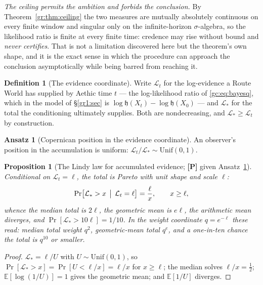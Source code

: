 \documentclass[11pt]{article}
\numberwithin{equation}{section}
\theoremstyle{plain}
\newtheorem{proposition}[theorem]{Proposition}
\theoremstyle{definition}
\newtheorem{definition}[theorem]{Definition}
\newtheorem{ansatz}[theorem]{Ansatz}
\theoremstyle{remark}
\newcommand{\E}{\mathbb{E}}
\newcommand{\Lc}{\mathcal{L}}
\newcommand{\hm}{\mathfrak{h}}
\begin{document}
\emph{The ceiling permits the ambition and forbids the conclusion.} By
Theorem~\ref{gr:thm:ceiling} the two measures are mutually absolutely
continuous on every finite window and singular only on the
infinite-horizon $\sigma$-algebra, so the likelihood ratio is finite at
every finite time: credence may rise without bound and \emph{never
certifies}. That is not a limitation discovered here but the theorem's
own shape, and it is the exact sense in which the procedure can approach
the conclusion asymptotically while being barred from reaching it.

\begin{definition}[The evidence coordinate]\label{gc:def:evidence}
Write $\Lc_t$ for the log-evidence a Route World has supplied by Aethic
time $t$ --- the log-likelihood ratio of \eqref{gc:eq:bayesq}, which in
the model of \S\ref{gr1:sec} is $\log\hm(X_t)-\log\hm(X_0)$ --- and
$\Lc_\ast$ for the total the conditioning ultimately supplies. Both are
nondecreasing, and $\Lc_\ast\ge\Lc_t$ by construction.
\end{definition}

\begin{ansatz}[Copernican position in the evidence coordinate]
\label{gc:ans:copernican}
An observer's position in the accumulation is uniform:
$\Lc_t/\Lc_\ast\sim\mathrm{Unif}(0,1)$.
\end{ansatz}

\begin{proposition}[The Lindy law for accumulated evidence;
\textbf{[P]} given Ansatz~\ref{gc:ans:copernican}]\label{gc:prop:lindy}
Conditional on $\Lc_t=\ell$, the total is Pareto with unit shape and
scale $\ell$:
\begin{equation}\label{gc:eq:lindylaw}
\Pr\bigl[\Lc_\ast>x\,\bigm|\,\Lc_t=\ell\bigr]=\frac{\ell}{x},
\qquad x\ge\ell,
\end{equation}
whence the median total is $2\ell$, the geometric mean is $e\ell$, the
arithmetic mean diverges, and $\Pr[\Lc_\ast>10\ell]=1/10$. In the
weight coordinate $q=e^{-\ell}$ these read: median total weight $q^{2}$,
geometric-mean total $q^{e}$, and a one-in-ten chance the total is
$q^{10}$ or smaller.
\end{proposition}

\begin{proof}
$\Lc_\ast=\ell/U$ with $U\sim\mathrm{Unif}(0,1)$, so
$\Pr[\Lc_\ast>x]=\Pr[U<\ell/x]=\ell/x$ for $x\ge\ell$; the median solves
$\ell/x=\tfrac12$; $\E[\log(1/U)]=1$ gives the geometric mean; and
$\E[1/U]$ diverges.
\end{proof}
\end{document}
